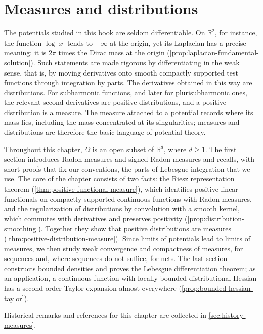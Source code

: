 \chapter{Measures and distributions}
\label{chap:p01}
The potentials studied in this book are seldom differentiable. On $\mathbb R^2$, for instance, the function $\log|x|$ tends to $-\infty$ at the origin, yet its Laplacian has a precise meaning: it is $2\pi$ times the Dirac mass at the origin (\cref{prop:laplacian-fundamental-solution}). Such statements are made rigorous by differentiating in the weak sense, that is, by moving derivatives onto smooth compactly supported test functions through integration by parts. The derivatives obtained in this way are distributions. For subharmonic functions, and later for plurisubharmonic ones, the relevant second derivatives are positive distributions, and a positive distribution is a measure. The measure attached to a potential records where its mass lies, including the mass concentrated at its singularities; measures and distributions are therefore the basic language of potential theory.

Throughout this chapter, $\Omega$ is an open subset of $\mathbb R^d$, where $d\geq1$. The first section introduces Radon measures and signed Radon measures and recalls, with short proofs that fix our conventions, the parts of Lebesgue integration that we use. The core of the chapter consists of two facts: the Riesz representation theorem (\cref{thm:positive-functional-measure}), which identifies positive linear functionals on compactly supported continuous functions with Radon measures, and the regularization of distributions by convolution with a smooth kernel, which commutes with derivatives and preserves positivity (\cref{prop:distribution-smoothing}). Together they show that positive distributions are measures (\cref{thm:positive-distribution-measure}). Since limits of potentials lead to limits of measures, we then study weak convergence and compactness of measures, for sequences and, where sequences do not suffice, for nets. The last section constructs bounded densities and proves the Lebesgue differentiation theorem; as an application, a continuous function with locally bounded distributional Hessian has a second-order Taylor expansion almost everywhere (\cref{prop:bounded-hessian-taylor}).

Historical remarks and references for this chapter are collected in \cref{sec:history-measures}.

